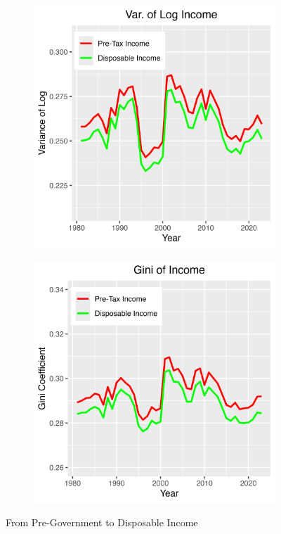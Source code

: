 \documentclass{article}
\begin{document}
\begin{figure}
\begin{subfigure}[t]{0.475\textwidth}
        \label{fig:Gov_Gini1}
    \end{subfigure}
    \begin{subfigure}[t]{0.475\textwidth}
        \centering
        \includegraphics[width=\textwidth]{Fig_5/Fig_5c_Var_inc.png}
        \label{fig:Gov_Var2}
    \end{subfigure}
    \begin{subfigure}[t]{0.475\textwidth}
        \centering
        \includegraphics[width=\textwidth]{Fig_5/Fig_5d_Gini_inc.png}
        \label{fig:Gov_Gini2}
    \end{subfigure}
    \caption{From Pre-Government to Disposable Income}
    \label{fig:Gov}
\end{figure}
\end{document}
